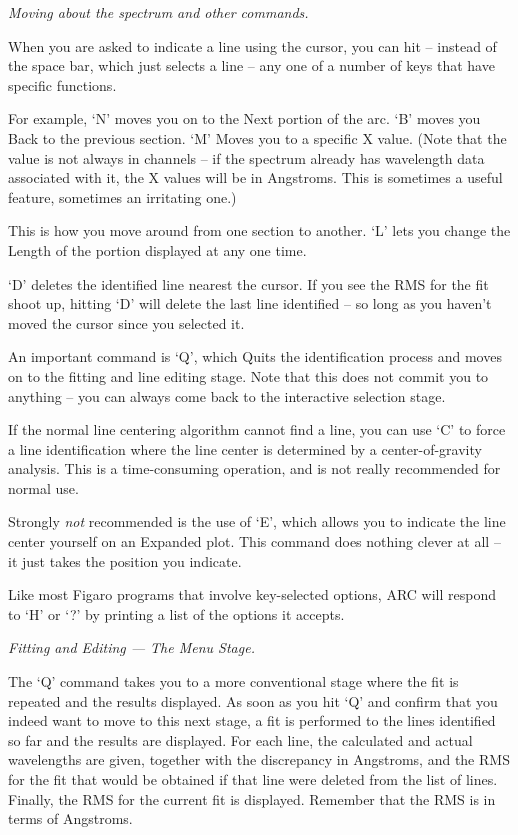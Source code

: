 \goodbreak
\vspace{12pt}
{\it Moving about the spectrum and other commands.}

When you are asked to indicate a line using the cursor, you can
hit -- instead of the space bar, which just selects a line -- any one of
a number of keys that have specific functions.  

For example, `N' moves you on to the Next portion of the arc.
`B' moves you Back to the previous section.  `M' Moves you to a 
specific X value.  (Note that the value is not always in channels -- if
the spectrum already has wavelength data associated with it, the X
values will be in Angstroms.  This is sometimes a useful feature, sometimes 
an irritating one.)

This is how you move around from one section to another.  `L' lets
you change the Length of the portion displayed at any one time.

`D' deletes the identified line nearest the cursor.  If you see
the RMS for the fit shoot up, hitting `D' will delete the last line
identified -- so long as you haven't moved the cursor since you selected
it.

An important command is `Q', which Quits the identification process
and moves on to the fitting and line editing stage. Note that this
does not commit you to anything -- you can always come back to the
interactive selection stage.

If the normal line centering algorithm cannot find a line, you can
use `C' to force a line identification where the line center is determined
by a center-of-gravity analysis.  This is a time-consuming operation, and
is not really recommended for normal use.

Strongly {\it not} recommended is the use of `E', which allows you to
indicate the line center yourself on an Expanded plot.  This command
does nothing clever at all -- it just takes the position you indicate.

Like most Figaro programs that involve key-selected options, ARC
will respond to `H' or `?' by printing a list of the options it
accepts.


\goodbreak
\vspace{12pt}
{\it Fitting and Editing --- The Menu Stage.}

The `Q' command takes you to a more conventional stage where the
fit is repeated and the results displayed.  As soon as you hit `Q' and
confirm that you indeed want to move to this next stage, a fit is performed
to the lines identified so far and the results are displayed.  For each line,
the calculated and actual wavelengths are given, together with the discrepancy
in Angstroms, and the RMS for the fit that would be obtained if that line
were deleted from the list of lines.  Finally, the RMS for the current fit
is displayed.  Remember that the RMS is in terms of Angstroms.

